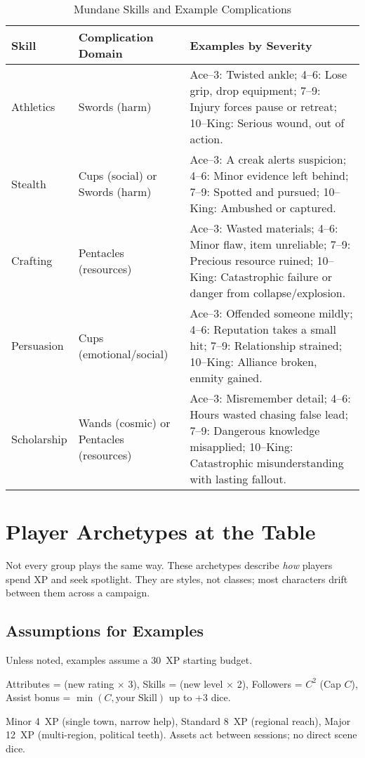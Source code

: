 \documentclass[12pt]{book}
\begin{document}
\begin{table}[h]
\centering
\begin{tabular}{|p{2cm}|p{3cm}|p{7cm}|}
\hline
\textbf{Skill} & \textbf{Complication Domain} & \textbf{Examples by Severity} \\
\hline
Athletics & Swords (harm) &  
Ace–3: Twisted ankle;  
4–6: Lose grip, drop equipment;  
7–9: Injury forces pause or retreat;  
10–King: Serious wound, out of action. \\
\hline
Stealth & Cups (social) or Swords (harm) &  
Ace–3: A creak alerts suspicion;  
4–6: Minor evidence left behind;  
7–9: Spotted and pursued;  
10–King: Ambushed or captured. \\
\hline
Crafting & Pentacles (resources) &  
Ace–3: Wasted materials;  
4–6: Minor flaw, item unreliable;  
7–9: Precious resource ruined;  
10–King: Catastrophic failure or danger from collapse/explosion. \\
\hline
Persuasion & Cups (emotional/social) &  
Ace–3: Offended someone mildly;  
4–6: Reputation takes a small hit;  
7–9: Relationship strained;  
10–King: Alliance broken, enmity gained. \\
\hline
Scholarship & Wands (cosmic) or Pentacles (resources) &  
Ace–3: Misremember detail;  
4–6: Hours wasted chasing false lead;  
7–9: Dangerous knowledge misapplied;  
10–King: Catastrophic misunderstanding with lasting fallout. \\
\hline
\end{tabular}
\caption{Mundane Skills and Example Complications}
\end{table}

\chapter{Player Archetypes at the Table}

Not every group plays the same way. These archetypes describe \emph{how} players spend XP and seek spotlight. They are styles, not classes; most characters drift between them across a campaign.

\section{Assumptions for Examples}
Unless noted, examples assume a 30~XP starting budget.
\begin{description}[leftmargin=2cm]
  \item[Costs:] Attributes = (new rating $\times$ 3), Skills = (new level $\times$ 2), Followers = $C^2$ (Cap $C$), Assist bonus = $\min(C,\text{your Skill})$ up to +3 dice.
  \item[Off-Screen Assets:] Minor 4~XP (single town, narrow help), Standard 8~XP (regional reach), Major 12~XP (multi-region, political teeth). Assets act between sessions; no direct scene dice.
\end{description}
\end{document}
